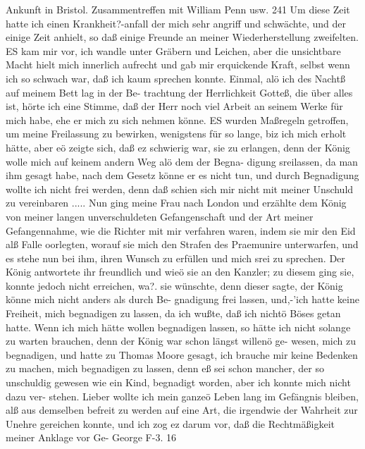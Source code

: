 Ankunft in Bristol. Zusammentreffen mit William Penn usw. 241
Um diese Zeit hatte ich einen Krankheit?-anfall der mich sehr
angriff und schwächte, und der einige Zeit anhielt, so daß einige
Freunde an meiner Wiederherstellung zweifelten. ES kam mir
vor, ich wandle unter Gräbern und Leichen, aber die unsichtbare
Macht hielt mich innerlich aufrecht und gab mir erquickende Kraft,
selbst wenn ich so schwach war, daß ich kaum sprechen konnte.
Einmal, alö ich des Nachtß auf meinem Bett lag in der Be-
trachtung der Herrlichkeit Gotteß, die über alles ist, hörte ich
eine Stimme, daß der Herr noch viel Arbeit an seinem Werke für
mich habe, ehe er mich zu sich nehmen könne.
ES wurden Maßregeln getroffen, um meine Freilassung zu
bewirken, wenigstens für so lange, biz ich mich erholt hätte, aber
eö zeigte sich, daß ez schwierig war, sie zu erlangen, denn der
König wolle mich auf keinem andern Weg alö dem der Begna-
digung sreilassen, da man ihm gesagt habe, nach dem Gesetz
könne er es nicht tun, und durch Begnadigung wollte ich nicht
frei werden, denn daß schien sich mir nicht mit meiner Unschuld
zu vereinbaren .....
Nun ging meine Frau nach London und erzählte dem König
von meiner langen unverschuldeten Gefangenschaft und der Art
meiner Gefangennahme, wie die Richter mit mir verfahren waren,
indem sie mir den Eid alß Falle oorlegten, worauf sie mich den
Strafen des Praemunire unterwarfen, und es stehe nun bei ihm,
ihren Wunsch zu erfüllen und mich srei zu sprechen. Der König
antwortete ihr freundlich und wieö sie an den Kanzler; zu diesem
ging sie, konnte jedoch nicht erreichen, wa?. sie wünschte, denn
dieser sagte, der König könne mich nicht anders als durch Be-
gnadigung frei lassen, und,-'ich hatte keine Freiheit, mich begnadigen
zu lassen, da ich wußte, daß ich nichtö Böses getan hatte. Wenn
ich mich hätte wollen begnadigen lassen, so hätte ich nicht solange
zu warten brauchen, denn der König war schon längst willenö ge-
wesen, mich zu begnadigen, und hatte zu Thomas Moore gesagt,
ich brauche mir keine Bedenken zu machen, mich begnadigen zu
lassen, denn eß sei schon mancher, der so unschuldig gewesen wie
ein Kind, begnadigt worden, aber ich konnte mich nicht dazu ver-
stehen. Lieber wollte ich mein ganzeö Leben lang im Gefängnis
bleiben, alß aus demselben befreit zu werden auf eine Art, die
irgendwie der Wahrheit zur Unehre gereichen konnte, und ich zog
ez darum vor, daß die Rechtmäßigkeit meiner Anklage vor Ge-
George F-3. 16


